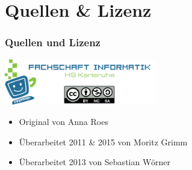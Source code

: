 \documentclass[final]{beamer}
\begin{document}
\section{Quellen \& Lizenz}
\begin{frame}
	\frametitle{Quellen und Lizenz}
	\begin{center}
		\includegraphics[width=250px]{gfx/fsi}
	\end{center}
	\begin{itemize}
		\item{Original von Anna Roes}
		\item{Überarbeitet 2011 \& 2015 von Moritz Grimm}
		\item{Überarbeitet 2013 von Sebastian Wörner}
	\end{itemize}
\end{frame}
\end{document}
